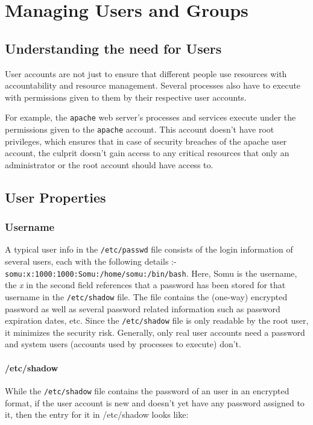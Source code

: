 \chapter{Managing Users and Groups}
\section{Understanding the need for Users}
User accounts are not just to ensure that different people use resources with accountability and resource management. Several processes also have to execute with permissions given to them by their respective user accounts. 

For example, the \verb|apache| web server's processes and services execute under the permissions given to the \verb|apache| account. This account doesn't have root privileges, which ensures that in case of security breaches of the apache user account, the culprit doesn't gain access to any critical resources that only an administrator or the root account should have access to. 

\section{User Properties}
\subsection{Username}

A typical user info in the \verb|/etc/passwd| file consists of the login information of several users, each with the following details :- \verb|somu:x:1000:1000:Somu:/home/somu:/bin/bash|. Here, Somu is the username, the \textit{x} in the second field references that a password has been stored for that username in the \verb|/etc/shadow| file. The file contains the (one-way) encrypted password as well as several password related information such as password expiration dates, etc. Since the \verb|/etc/shadow| file is only readable by the root user, it minimizes the security risk. Generally, only real user accounts need a password and system users (accounts used by processes to execute) don't. 

\subsubsection{/etc/shadow}
While the \verb|/etc/shadow| file contains the password of an user in an encrypted format, if the user account is new and doesn't yet have any password assigned to it, then the entry for it in /etc/shadow looks like: 

